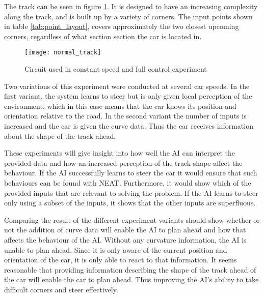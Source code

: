 The track can be seen in figure \ref{fig:normal_track}. It is designed to have an increasing complexity along the track, and is built up by a variety of corners. The input points shown in table \ref{tab:point_layout}, covers approximately the two closest upcoming corners, regardless of what section section the car is located in.

\begin{figure}
\texttt{[image: normal\_track]}
\caption{Circuit used in constant speed and full control experiment}
\label{fig:normal_track}
\centering
\end{figure}

Two variations of this experiment were conducted at several car speeds. In the first variant, the system learns to steer but is only given local perception of the environment, which in this case means that the car knows its position and orientation relative to the road. In the second variant the number of inputs is increased and the car is given the curve data. Thus the car receives information about the shape of the track ahead.

These experiments will give insight into how well the AI can interpret the provided data and how an increased perception of the track shape affect the behaviour. If the AI successfully learns to steer the car it would ensure that such behaviours can be found with NEAT. Furthermore, it would show which of the provided inputs that are relevant to solving the problem. If the AI learns to steer only using a subset of the inputs, it shows that the other inputs are superfluous. 

Comparing the result of the different experiment variants should show whether or not the addition of curve data will enable the AI to plan ahead and how that affects the behaviour of the AI. Without any curvature information, the AI is unable to plan ahead. Since it is only aware of the current position and orientation of the car, it is only able to react to that information. It seems reasonable that providing information describing the shape of the track ahead of the car will enable the car to plan ahead. Thus improving the AI's ability to take difficult corners and steer effectively. 


